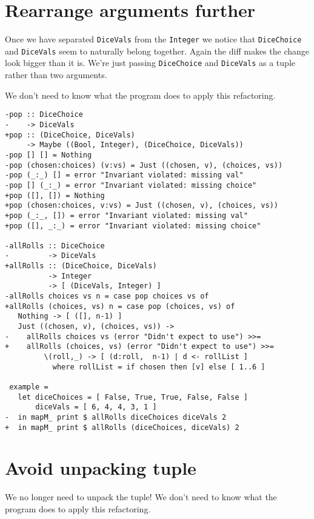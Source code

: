 \section{Rearrange arguments further}

Once we have separated \texttt{DiceVals} from the \texttt{Integer} we notice that \texttt{DiceChoice} and \texttt{DiceVals} seem to naturally belong together. Again the diff makes the change look bigger than it is. We're just passing \texttt{DiceChoice} and \texttt{DiceVals} as a tuple rather than two arguments.

We don't need to know what the program does to apply this refactoring.

\begin{verbatim}
-pop :: DiceChoice
-    -> DiceVals
+pop :: (DiceChoice, DiceVals)
     -> Maybe ((Bool, Integer), (DiceChoice, DiceVals))
-pop [] [] = Nothing
-pop (chosen:choices) (v:vs) = Just ((chosen, v), (choices, vs))
-pop (_:_) [] = error "Invariant violated: missing val"
-pop [] (_:_) = error "Invariant violated: missing choice"
+pop ([], []) = Nothing
+pop (chosen:choices, v:vs) = Just ((chosen, v), (choices, vs))
+pop (_:_, []) = error "Invariant violated: missing val"
+pop ([], _:_) = error "Invariant violated: missing choice"

-allRolls :: DiceChoice
-         -> DiceVals
+allRolls :: (DiceChoice, DiceVals)
          -> Integer
          -> [ (DiceVals, Integer) ]
-allRolls choices vs n = case pop choices vs of
+allRolls (choices, vs) n = case pop (choices, vs) of
   Nothing -> [ ([], n-1) ]
   Just ((chosen, v), (choices, vs)) ->
-    allRolls choices vs (error "Didn't expect to use") >>=
+    allRolls (choices, vs) (error "Didn't expect to use") >>=
         \(roll,_) -> [ (d:roll,  n-1) | d <- rollList ]
           where rollList = if chosen then [v] else [ 1..6 ]

 example =
   let diceChoices = [ False, True, True, False, False ]
       diceVals = [ 6, 4, 4, 3, 1 ]
-  in mapM_ print $ allRolls diceChoices diceVals 2
+  in mapM_ print $ allRolls (diceChoices, diceVals) 2
\end{verbatim}

\section{Avoid unpacking tuple}


We no longer need to unpack the tuple! We don't need to know what the program does to apply this refactoring.

